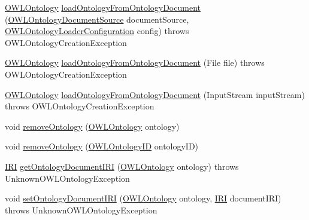 \begin{DoxyCompactItemize}
\item 
\hyperlink{interfaceorg_1_1semanticweb_1_1owlapi_1_1model_1_1_o_w_l_ontology}{O\-W\-L\-Ontology} \hyperlink{classuk_1_1ac_1_1manchester_1_1cs_1_1owl_1_1owlapi_1_1_o_w_l_ontology_manager_impl_a18e77c90fae7c55c1769ad1134cd8102}{load\-Ontology\-From\-Ontology\-Document} (\hyperlink{interfaceorg_1_1semanticweb_1_1owlapi_1_1io_1_1_o_w_l_ontology_document_source}{O\-W\-L\-Ontology\-Document\-Source} document\-Source, \hyperlink{classorg_1_1semanticweb_1_1owlapi_1_1model_1_1_o_w_l_ontology_loader_configuration}{O\-W\-L\-Ontology\-Loader\-Configuration} config)  throws O\-W\-L\-Ontology\-Creation\-Exception 
\item 
\hyperlink{interfaceorg_1_1semanticweb_1_1owlapi_1_1model_1_1_o_w_l_ontology}{O\-W\-L\-Ontology} \hyperlink{classuk_1_1ac_1_1manchester_1_1cs_1_1owl_1_1owlapi_1_1_o_w_l_ontology_manager_impl_aa82f6ffb1454d0dba83b7757f4eb02a1}{load\-Ontology\-From\-Ontology\-Document} (File file)  throws O\-W\-L\-Ontology\-Creation\-Exception 
\item 
\hyperlink{interfaceorg_1_1semanticweb_1_1owlapi_1_1model_1_1_o_w_l_ontology}{O\-W\-L\-Ontology} \hyperlink{classuk_1_1ac_1_1manchester_1_1cs_1_1owl_1_1owlapi_1_1_o_w_l_ontology_manager_impl_acd2e21c6e72e9804cc8ab0239cf033b5}{load\-Ontology\-From\-Ontology\-Document} (Input\-Stream input\-Stream)  throws O\-W\-L\-Ontology\-Creation\-Exception 
\item 
void \hyperlink{classuk_1_1ac_1_1manchester_1_1cs_1_1owl_1_1owlapi_1_1_o_w_l_ontology_manager_impl_a145567490e30a38ae41859e64ece2b70}{remove\-Ontology} (\hyperlink{interfaceorg_1_1semanticweb_1_1owlapi_1_1model_1_1_o_w_l_ontology}{O\-W\-L\-Ontology} ontology)
\item 
void \hyperlink{classuk_1_1ac_1_1manchester_1_1cs_1_1owl_1_1owlapi_1_1_o_w_l_ontology_manager_impl_ad25b412e9a3944112938a44c2f81056f}{remove\-Ontology} (\hyperlink{classorg_1_1semanticweb_1_1owlapi_1_1model_1_1_o_w_l_ontology_i_d}{O\-W\-L\-Ontology\-I\-D} ontology\-I\-D)
\item 
\hyperlink{classorg_1_1semanticweb_1_1owlapi_1_1model_1_1_i_r_i}{I\-R\-I} \hyperlink{classuk_1_1ac_1_1manchester_1_1cs_1_1owl_1_1owlapi_1_1_o_w_l_ontology_manager_impl_ab64199b2259a9e096981f7d2c30b293c}{get\-Ontology\-Document\-I\-R\-I} (\hyperlink{interfaceorg_1_1semanticweb_1_1owlapi_1_1model_1_1_o_w_l_ontology}{O\-W\-L\-Ontology} ontology)  throws Unknown\-O\-W\-L\-Ontology\-Exception 
\item 
void \hyperlink{classuk_1_1ac_1_1manchester_1_1cs_1_1owl_1_1owlapi_1_1_o_w_l_ontology_manager_impl_a20435e2ec85660f27372cd5d29b5bf24}{set\-Ontology\-Document\-I\-R\-I} (\hyperlink{interfaceorg_1_1semanticweb_1_1owlapi_1_1model_1_1_o_w_l_ontology}{O\-W\-L\-Ontology} ontology, \hyperlink{classorg_1_1semanticweb_1_1owlapi_1_1model_1_1_i_r_i}{I\-R\-I} document\-I\-R\-I)  throws Unknown\-O\-W\-L\-Ontology\-Exception 

\end{DoxyCompactItemize}
